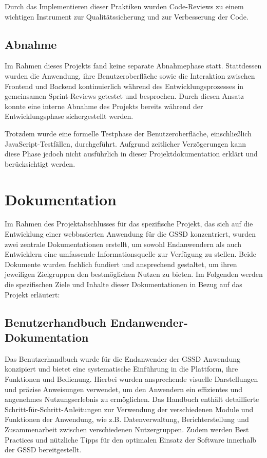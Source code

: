 \begin{flushleft}
	Durch das Implementieren dieser Praktiken wurden Code-Reviews zu einem wichtigen Instrument zur Qualitätssicherung und zur Verbesserung der Code.

	\subsection{Abnahme}
	Im Rahmen dieses Projekts fand keine separate Abnahmephase statt. Stattdessen wurden die Anwendung, ihre Benutzeroberfläche sowie die Interaktion zwischen Frontend und Backend kontinuierlich während des Entwicklungsprozesses in gemeinsamen Sprint-Reviews getestet und besprochen. Durch diesen Ansatz konnte eine interne Abnahme des Projekts bereits während der Entwicklungsphase sichergestellt werden.

	Trotzdem wurde eine formelle Testphase der Benutzeroberfläche, einschließlich JavaScript-Testfällen, durchgeführt. Aufgrund zeitlicher Verzögerungen kann diese Phase jedoch nicht ausführlich in dieser Projektdokumentation erklärt und berücksichtigt werden.


	\section{Dokumentation}
	Im Rahmen des Projektabschlusses für das spezifische Projekt, das sich auf die Entwicklung einer webbasierten Anwendung für die \acs{GSSD} konzentriert, wurden zwei zentrale Dokumentationen erstellt, um sowohl Endanwendern als auch Entwicklern eine umfassende Informationsquelle zur Verfügung zu stellen. Beide Dokumente wurden fachlich fundiert und ansprechend gestaltet, um ihren jeweiligen Zielgruppen den bestmöglichen Nutzen zu bieten. Im Folgenden werden die spezifischen Ziele und Inhalte dieser Dokumentationen in Bezug auf das Projekt erläutert:
	\subsection{Benutzerhandbuch Endanwender-Dokumentation}

	Das Benutzerhandbuch wurde für die Endanwender der \acs{GSSD} Anwendung konzipiert und bietet eine systematische Einführung in die Plattform, ihre Funktionen und Bedienung. Hierbei wurden ansprechende visuelle Darstellungen und präzise Anweisungen verwendet, um den Anwendern ein effizientes und angenehmes Nutzungserlebnis zu ermöglichen. Das Handbuch enthält detaillierte Schritt-für-Schritt-Anleitungen zur Verwendung der verschiedenen Module und Funktionen der Anwendung, wie z.B. Datenverwaltung, Berichterstellung und Zusammenarbeit zwischen verschiedenen Nutzergruppen. Zudem werden Best Practices und nützliche Tipps für den optimalen Einsatz der Software innerhalb der \acs{GSSD} bereitgestellt.


\end{flushleft}
